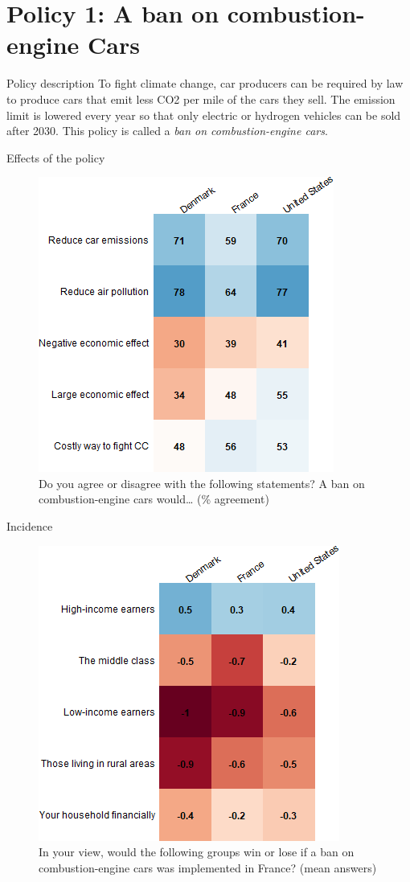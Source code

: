 \documentclass[aspectratio=169,9pt,dvipsnames]{beamer}
\begin{document}
\section{Policy 1: A ban on combustion-engine Cars}

\begin{frame}{Policy description}%
To fight climate change, car producers can be required by law to produce cars that emit less CO2 per mile of the cars they sell. The emission limit is lowered every year so that only electric or hydrogen vehicles can be sold after 2030. This policy is called a \textit{ban on combustion-engine cars}. 
\end{frame}

\begin{frame}{Effects of the policy}%

\begin{figure}[h!]
\centering
\caption{Do you agree or disagree with the following statements? A ban on combustion-engine cars would… (\% agreement)}
\includegraphics[width=.45\textwidth]{../figures/country_comparison/standard_effect_positive_countries.png}
\end{figure}
\end{frame}

\begin{frame}{Incidence}%
\begin{figure}[h!]
\centering
\caption{In your view, would the following groups win or lose if a ban on combustion-engine cars was implemented in France? (mean answers)}
\includegraphics[width=.45\textwidth]{../figures/country_comparison/standard_win_lose_mean_countries.png}
\end{figure}
\end{frame}
\end{document}

